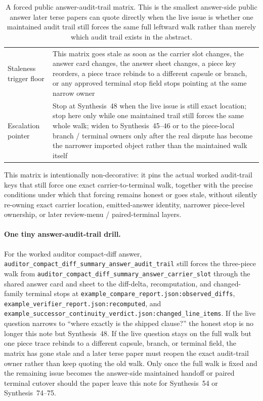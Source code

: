 \documentclass[11pt]{article}
\begin{document}
\begin{table}[t]
\begin{tabularx}{\linewidth}{@{}lX@{}}
Staleness trigger floor & This matrix goes stale as soon as the carrier slot changes, the answer card changes, the answer sheet changes, a piece key reorders, a piece trace rebinds to a different capsule or branch, or any approved terminal stop field stops pointing at the same narrow owner \\
Escalation pointer & Stop at Synthesis~48 when the live issue is still exact location; stop here only while one maintained trail still forces the same whole walk; widen to Synthesis~45--46 or to the piece-local branch / terminal owners only after the real dispute has become the narrower imported object rather than the maintained walk itself \\
\bottomrule
\end{tabularx}
\caption{A forced public answer-audit-trail matrix. This is the smallest answer-side public answer later terse papers can quote directly when the live issue is whether one maintained audit trail still forces the same full leftward walk rather than merely which audit trail exists in the abstract.}
\label{tab:forced-public-answer-audit-trail-matrix}
\end{table}

This matrix is intentionally non-decorative: it pins the actual worked audit-trail keys that still force one exact carrier-to-terminal walk, together with the precise conditions under which that forcing remains honest or goes stale, without silently re-owning exact carrier location, emitted-answer identity, narrower piece-level ownership, or later review-menu / paired-terminal layers.\cite{series:workedexample}

\paragraph{One tiny answer-audit-trail drill.}
For the worked auditor compact-diff answer, \nolinkurl{auditor_compact_diff_summary_answer_audit_trail} still forces the three-piece walk from \nolinkurl{auditor_compact_diff_summary_answer_carrier_slot} through the shared answer card and sheet to the diff-delta, recomputation, and changed-family terminal stops at \nolinkurl{example_compare_report.json:observed_diffs}, \nolinkurl{example_verifier_report.json:recomputed}, and \nolinkurl{example_successor_continuity_verdict.json:changed_line_items}. If the live question narrows to ``where exactly is the shipped clause?'' the honest stop is no longer this note but Synthesis~48. If the live question stays on the full walk but one piece trace rebinds to a different capsule, branch, or terminal field, the matrix has gone stale and a later terse paper must reopen the exact audit-trail owner rather than keep quoting the old walk. Only once the full walk is fixed and the remaining issue becomes the answer-side maintained handoff or paired terminal cutover should the paper leave this note for Synthesis~54 or Synthesis~74--75.\cite{series:workedexample}
\end{document}
